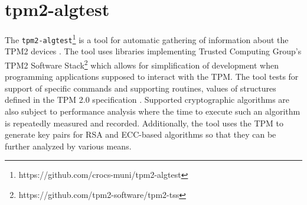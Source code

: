 \section{tpm2-algtest}
The \texttt{tpm2-algtest}\footnote{https://github.com/crocs-muni/tpm2-algtest} is a tool for automatic gathering of information about the TPM2 devices \cite{Struk2019thesis}. The tool uses libraries implementing Trusted Computing Group's TPM2 Software Stack\footnote{https://github.com/tpm2-software/tpm2-tss} which allows for simplification of development when programming applications supposed to interact with the TPM. The tool tests for support of specific commands and supporting routines, values of structures defined in the TPM 2.0 specification \cite{tcg_p3_commands, tcg_p4_supproutines, tcg_p2_structures}. Supported cryptographic algorithms are also subject to performance analysis where the time to execute such an algorithm is repeatedly measured and recorded. Additionally, the tool uses the TPM to generate key pairs for RSA and ECC-based algorithms so that they can be further analyzed by various means.

